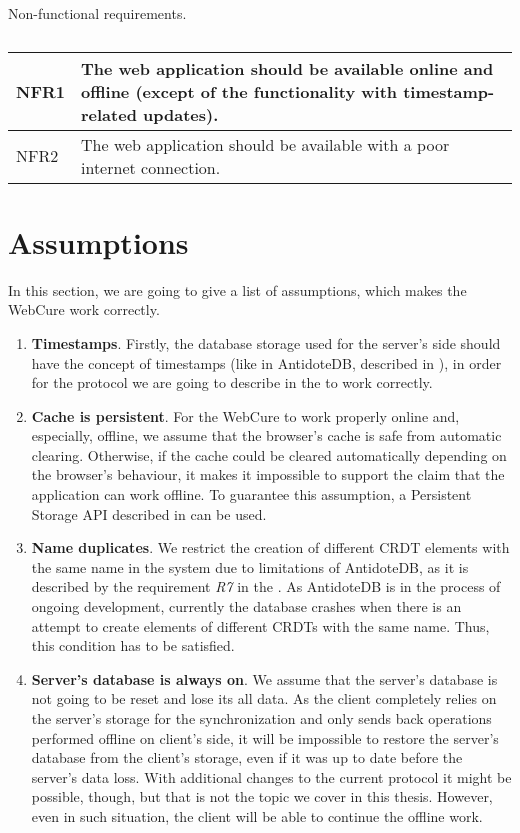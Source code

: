 \begin{table}[!htbp]
\centering
\caption{Non-functional requirements.}
\label{table:req2}
\begin{tabular}{|p{1cm}|p{14cm}|}
\hline
NFR1 & The web application should be available online and offline (except of the functionality with timestamp-related updates). \\ \hline
NFR2 & The web application should be available with a poor internet connection. \\ \hline
\end{tabular}
\caption*{}
\end{table}

\section{Assumptions}

In this section, we are going to give a list of assumptions, which makes the WebCure work correctly. 

\begin{enumerate}
\item {\textbf{Timestamps}. Firstly, the database storage used for the server's side should have the concept of timestamps (like in AntidoteDB, described in ), in order for the protocol we are going to describe in the  to work correctly.}
\item {\textbf{Cache is persistent}. For the WebCure to work properly online and, especially, offline, we assume that the browser's cache is safe from automatic clearing. Otherwise, if the cache could be cleared automatically depending on the browser's behaviour, it makes it impossible to support the claim that the application can work offline. To guarantee this assumption, a Persistent Storage API described in  can be used.}
\item{\textbf{Name duplicates}. We restrict the creation of different CRDT elements with the same name in the system due to limitations of AntidoteDB, as it is described by the requirement \textit{R7} in the . As AntidoteDB is in the process of ongoing development, currently the database crashes when there is an attempt to create elements of different CRDTs with the same name. Thus, this condition has to be satisfied.}
\item{\textbf{Server's database is always on}. We assume that the server's database is not going to be reset and lose its all data. As the client completely relies on the server's storage for the synchronization and only sends back operations performed offline on client's side, it will be impossible to restore the server's database from the client's storage, even if it was up to date before the server's data loss. With additional changes to the current protocol it might be possible, though, but that is not the topic we cover in this thesis. However, even in such situation, the client will be able to continue the offline work.}
\end{enumerate}

